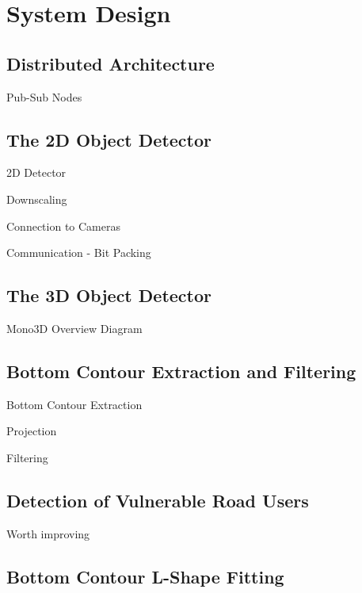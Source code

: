 
\chapter{System Design}
\label{ch:system}

\section{Distributed Architecture}
\label{sec:arch}

Pub-Sub Nodes


\section{The 2D Object Detector}
\label{sec:segmentation}

2D Detector \par
Downscaling \par
Connection to Cameras \par
Communication - Bit Packing

\section{The 3D Object Detector}
\label{sec:mono3doverview}

Mono3D Overview Diagram


\section{Bottom Contour Extraction and Filtering}
\label{sec:botcont}

Bottom Contour Extraction \par
Projection \par
Filtering

\section{Detection of Vulnerable Road Users}
\label{sec:pedcyc}

Worth improving

\section{Bottom Contour L-Shape Fitting}
\label{sec:botcontlsf}

